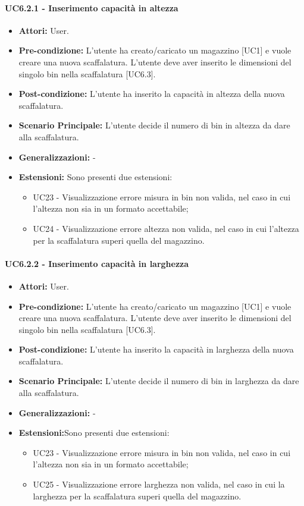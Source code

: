 \paragraph{UC6.2.1 - Inserimento capacità in altezza}
\begin{itemize}
    \item \textbf{Attori:} User.
    \item \textbf{Pre-condizione:} L'utente ha creato/caricato un magazzino [UC1] e vuole creare una nuova scaffalatura. L'utente deve aver inserito le dimensioni del singolo bin nella scaffalatura [UC6.3].
    \item \textbf{Post-condizione:}  L'utente ha inserito la capacità in altezza della nuova scaffalatura.
    \item \textbf{Scenario Principale:}  L'utente decide il numero di bin in altezza da dare alla scaffalatura. 
    \item \textbf{Generalizzazioni:} -
    \item \textbf{Estensioni:} Sono presenti due estensioni:
    \begin{itemize}
        \item UC23 - Visualizzazione errore misura in bin non valida, nel caso in cui l'altezza non sia in un formato accettabile;
        \item UC24 - Visualizzazione errore altezza non valida, nel caso in cui l'altezza per la scaffalatura superi quella del magazzino.
    \end{itemize}
\end{itemize}


\paragraph{UC6.2.2 - Inserimento capacità in larghezza}
\begin{itemize}
    \item \textbf{Attori:} User.
    \item \textbf{Pre-condizione:} L'utente ha creato/caricato un magazzino [UC1] e vuole creare una nuova scaffalatura. L'utente deve aver inserito le dimensioni del singolo bin nella scaffalatura [UC6.3].
    \item \textbf{Post-condizione:}  L'utente ha inserito la capacità in larghezza della nuova scaffalatura.
    \item \textbf{Scenario Principale:}  L'utente decide il numero di bin in larghezza da dare alla scaffalatura.
    \item \textbf{Generalizzazioni:} -
    \item \textbf{Estensioni:}Sono presenti due estensioni:
    \begin{itemize}
        \item UC23 - Visualizzazione errore misura in bin non valida, nel caso in cui l'altezza non sia in un formato accettabile;
        \item UC25 - Visualizzazione errore larghezza non valida, nel caso in cui la larghezza per la scaffalatura superi quella del magazzino.
    \end{itemize}
\end{itemize}


